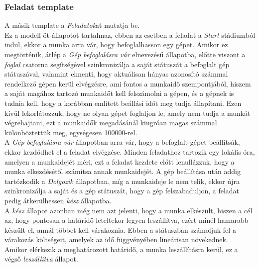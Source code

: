\documentclass {report}
\begin{document}
    \subsubsection*{Feladat template}
    A másik template a \emph{Feladatok}at mutatja be.\\
    Ez a modell öt állapotot tartalmaz, ebben az esetben a feladat a \emph{Start} stádiumból indul, ekkor a munka arra vár, hogy befoglalhasson egy gépet. Amikor ez megtörténik, átlép a \emph{Gép befoglalásra vár} elnevezésű állapotba, előtte viszont a \emph{foglal} csatorna segítségével szinkronizálja a saját státuszát a befoglalt gép státuszával, valamint elmenti, hogy aktuálisan hányas azonosító számmal rendelkező gépen kerül elvégzésre, ami fontos a munkaidő szempontjából, hiszem a saját magához tartozó munkaidőt kell felszámolni a gépen, és a gépnek is tudnia kell, hogy a korábban említett beállási időt meg tudja állapítani. Ezen kívül lekorlátozzuk, hogy ne olyan gépet foglaljon le, amely nem tudja a munkát végrehajtani, ezt a munkaidők megadásánál kiugróan magas számmal különböztettük meg, egységesen 100000-rel. \\
    A \emph{Gép befoglalásra vár} állapotban arra vár, hogy a befoglalt gépet beállítsák, ekkor kezdődhet el a feladat elvégzése. Minden feladathoz tartozik egy lokális óra, amelyen a munkaidejét méri, ezt a feladat kezdete előtt lenullázzuk, hogy a munka elkezdésétől számítsa annak munkaidejét. A gép beállítása után addig tartózkodik a \emph{Dolgozik} állapotban, míg a munkaideje le nem telik, ekkor újra szinkronizálja a saját és a gép státuszát, hogy a gép felszabaduljon, a feladat pedig átkerülhessen \emph{kész} állapotba. \\
    A \emph{kész} állapot azonban még nem azt jelenti, hogy a munka elkészült, hiszen a cél az, hogy pontosan a határidő leteltekor legyen leszállítva, ezért minél hamarabb készült el, annál többet kell várakoznia. Ebben a státuszban számoljuk fel a várakozás költségeit, amelyek az idő függvényében lineárisan növekednek. \\
    Amikor elérkezik a meghatározott határidő, a munka leszállításra kerül, ez a végső \emph{leszállítva} állapot.  
\end{document}

